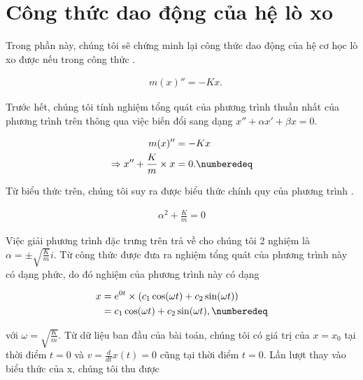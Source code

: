 \appendix
\chapter{Công thức dao động của hệ lò xo}
\label{proof::spring_formula}

	Trong phần này, chúng tôi sẽ chứng minh lại công thức dao động của hệ cơ học lò xo được nếu trong công thức .
	
		\begin{equation}
			\begin{aligned}
				& m(x)'' = -K x.
			\end{aligned}
		\label{appendix::spring_sys_0}
		\end{equation}

	Trước hết, chúng tôi tính nghiệm tổng quát của phương trình thuần nhất của phương trình trên thông qua việc biến đổi sang dạng $x'' + \alpha x' + \beta x = 0$.
	
		\begin{align*}
			m(x)'' & = -K x\\
			\Rightarrow  x'' + \frac{K}{m} \times x & = 0. \numberedeq
			\label{appendix::spring_sys_1}
		\end{align*}

	Từ biểu thức trên, chúng tôi suy ra được biểu thức chính quy của phương trình .
	
		\begin{equation}
			\begin{aligned}
				\alpha^2 + \frac{K}{m} = 0
			\end{aligned}
			\label{appendix::spring_sys_2}
		\end{equation}

	Việc giải phương trình đặc trưng trên trả về cho chúng tôi 2 nghiệm là $\alpha = \pm \sqrt{\frac{K}{m}}i$. Từ công thức được đưa ra nghiệm tổng quát của phương trình này có dạng phức, do đó nghiệm của phương trình này có dạng
	
		\begin{align*}
			x & = e^{0t} \times (c_1 \cos(\omega t) + c_2 \sin(\omega t))\\
			& = c_1 \cos(\omega t) + c_2 \sin(\omega t), \numberedeq
			\label{appendix::spring_sys_3}
		\end{align*}

	\noindent với $\omega = \sqrt{\frac{K}{m}}$. Từ dữ liệu ban đầu của bài toán, chúng tôi có giá trị của $x = x_0$ tại thời điểm $t = 0$ và $v = \frac{d}{dt}x(t) = 0$ cũng tại thời điểm $t = 0$. Lần lượt thay vào biểu thức của x, chúng tôi thu được
	
